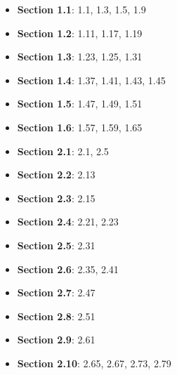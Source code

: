 \documentclass[a4paper, 11pt]{article}
\begin{document}
\begin{itemize}
\item
  \textbf{Section 1.1}: 1.1, 1.3, 1.5, 1.9
\item
  \textbf{Section 1.2}: 1.11, 1.17, 1.19
\item
  \textbf{Section 1.3}: 1.23, 1.25, 1.31
\item
  \textbf{Section 1.4}: 1.37, 1.41, 1.43, 1.45
\item
  \textbf{Section 1.5}: 1.47, 1.49, 1.51
\item
  \textbf{Section 1.6}: 1.57, 1.59, 1.65
\item
  \textbf{Section 2.1}: 2.1, 2.5
\item
  \textbf{Section 2.2}: 2.13
\item
  \textbf{Section 2.3}: 2.15
\item
  \textbf{Section 2.4}: 2.21, 2.23
\item
  \textbf{Section 2.5}: 2.31
\item
  \textbf{Section 2.6}: 2.35, 2.41
\item
  \textbf{Section 2.7}: 2.47
\item
  \textbf{Section 2.8}: 2.51
\item
  \textbf{Section 2.9}: 2.61
\item
  \textbf{Section 2.10}: 2.65, 2.67, 2.73, 2.79
\end{itemize}
\end{document}
